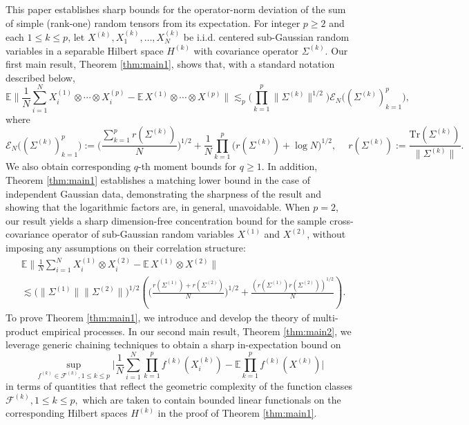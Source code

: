 \documentclass[numbers,webpdf,imaiai]{ima-authoring-template}
\theoremstyle{thmstyletwo}%
\numberwithin{equation}{section}
\numberwithin{equation}{section}
\newcommand{\F}{\mathcal{F}}
\newcommand{\E}{\mathbb{E}}
\begin{document}
This paper establishes sharp bounds for the operator-norm deviation of the sum of simple (rank-one) random tensors from its expectation. For integer $p\ge 2$ and each $1\le k\le p$, let $X^{(k)},X^{(k)}_1,\ldots,X^{(k)}_N$ be i.i.d. centered sub-Gaussian random variables in a separable Hilbert space $H^{(k)}$ with covariance operator $\Sigma^{(k)}$. Our first main result, Theorem \ref{thm:main1}, shows that, with a standard notation described below,
\[
\E \bigg\|\frac{1}{N} \sum_{i=1}^N X_i^{(1)} \otimes \cdots \otimes X_i^{(p)}-\E\, X^{(1)} \otimes \cdots \otimes X^{(p)}\bigg\| \lesssim_p \bigg(\prod_{k=1}^p\|\Sigma^{(k)}\|^{1 / 2}\bigg)\mathscr{E}_N\big((\Sigma^{(k)})_{k=1}^p\big),
\]
where
\[
\mathscr{E}_N\big((\Sigma^{(k)})_{k=1}^p\big):= \bigg(\frac{\sum_{k=1}^p r(\Sigma^{(k)})}{N}\bigg)^{1/2}+\frac{1}{N}\prod_{k=1}^{p}\Big(r(\Sigma^{(k)})+\log N\Big)^{1/2},\quad \ r(\Sigma^{(k)}):=\frac{\mathrm{Tr}(\Sigma^{(k)})}{\|\Sigma^{(k)}\|}.
\]
We also obtain corresponding $q$-th moment bounds for $q\ge 1$. In addition, Theorem \ref{thm:main1} establishes a matching lower bound in the case of independent Gaussian data, demonstrating the sharpness of the result and showing that the logarithmic factors are, in general, unavoidable. When $p=2$, our result yields a sharp dimension-free concentration bound for the sample cross-covariance operator of sub-Gaussian random variables $X^{(1)} $ and $X^{(2)}$, without imposing any assumptions on their correlation structure:
\begin{align*}
&\E \bigg\|\frac{1}{N}\sum_{i=1}^{N}X^{(1)}_i\otimes X^{(2)}_i-\E\, X^{(1)}\otimes X^{(2)}\bigg\| \\
& \lesssim \big(\|\Sigma^{(1)}\|\|\Sigma^{(2)}\|\big)^{1/2}\left(\bigg(\frac{r(\Sigma^{(1)})+r(\Sigma^{(2)})}{N}\bigg)^{1/2}+\frac{(r(\Sigma^{(1)})r(\Sigma^{(2)}))^{1/2}}{N}\right).
\end{align*} To prove Theorem \ref{thm:main1}, we introduce and develop the theory of multi-product empirical processes. In our second main result, Theorem \ref{thm:main2}, we leverage generic chaining techniques to obtain a sharp in-expectation bound on
 \begin{equation*}
 \sup_{f^{(k)} \in \mathcal{F}^{(k)},1\le k\le p}\bigg|\frac{1}{N} \sum_{i=1}^N \prod_{k=1}^p f^{(k)} (X^{(k)}_i)-\mathbb{E} \prod_{k=1}^p f^{(k)} (X^{(k)})\bigg|
\end{equation*}
in terms of quantities that reflect the geometric complexity of the function classes $\F^{(k)}, 1\le k\le p,$ which are taken to contain bounded linear functionals on the corresponding Hilbert spaces $H^{(k)}$ in the proof of Theorem \ref{thm:main1}. 
\end{document}
